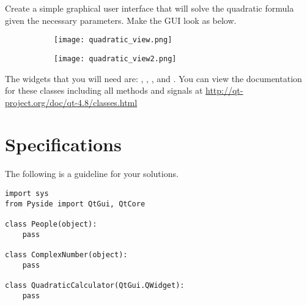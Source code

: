\begin{problem}
Create a simple graphical user interface that will solve the quadratic formula given the necessary parameters.
Make the GUI look as below.
\begin{figure}[H]
\centering
\begin{subfigure}[b]{.49\textwidth}
\texttt{[image: quadratic\_view.png]}
\end{subfigure}
\begin{subfigure}[b]{.49\textwidth}
\texttt{[image: quadratic\_view2.png]}
\end{subfigure}
\end{figure}
The widgets that you will need are: , , , and .
You can view the documentation for these classes including all methods and signals at \url{http://qt-project.org/doc/qt-4.8/classes.html}
\label{prob:quadCalc}
\end{problem}


\section*{Specifications}

The following is a guideline for your solutions.

\begin{lstlisting}
import sys
from Pyside import QtGui, QtCore

class People(object):
	pass
	
class ComplexNumber(object):
	pass
	
class QuadraticCalculator(QtGui.QWidget):
	pass
\end{lstlisting}

